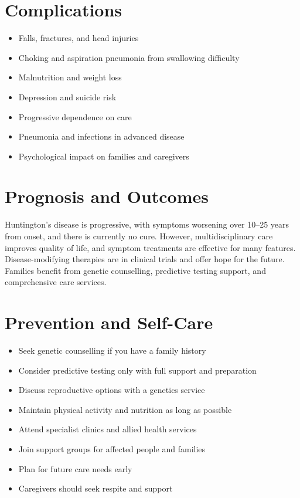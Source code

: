 \section*{Complications}
\begin{itemize}
    \item Falls, fractures, and head injuries
    \item Choking and aspiration pneumonia from swallowing difficulty
    \item Malnutrition and weight loss
    \item Depression and suicide risk
    \item Progressive dependence on care
    \item Pneumonia and infections in advanced disease
    \item Psychological impact on families and caregivers
\end{itemize}

\section*{Prognosis and Outcomes}
Huntington's disease is progressive, with symptoms worsening over 10--25 years from onset, and there is currently no cure. However, multidisciplinary care improves quality of life, and symptom treatments are effective for many features. Disease-modifying therapies are in clinical trials and offer hope for the future. Families benefit from genetic counselling, predictive testing support, and comprehensive care services.

\section*{Prevention and Self-Care}
\begin{itemize}
    \item Seek genetic counselling if you have a family history
    \item Consider predictive testing only with full support and preparation
    \item Discuss reproductive options with a genetics service
    \item Maintain physical activity and nutrition as long as possible
    \item Attend specialist clinics and allied health services
    \item Join support groups for affected people and families
    \item Plan for future care needs early
    \item Caregivers should seek respite and support
\end{itemize}

